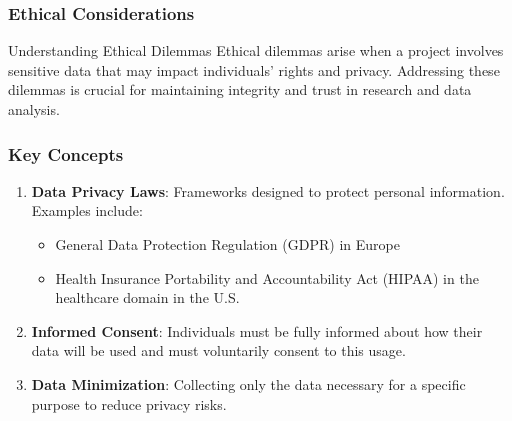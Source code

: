 \documentclass[aspectratio=169]{beamer}
\begin{document}
\begin{frame}[fragile]
  \frametitle{Ethical Considerations}
  \begin{block}{Understanding Ethical Dilemmas}
    Ethical dilemmas arise when a project involves sensitive data that may impact individuals' rights and privacy. Addressing these dilemmas is crucial for maintaining integrity and trust in research and data analysis.
  \end{block}
\end{frame}

\begin{frame}[fragile]
  \frametitle{Key Concepts}
  \begin{enumerate}
    \item \textbf{Data Privacy Laws}: Frameworks designed to protect personal information. Examples include:
    \begin{itemize}
        \item General Data Protection Regulation (GDPR) in Europe
        \item Health Insurance Portability and Accountability Act (HIPAA) in the healthcare domain in the U.S.
    \end{itemize}
    
    \item \textbf{Informed Consent}: Individuals must be fully informed about how their data will be used and must voluntarily consent to this usage.

    \item \textbf{Data Minimization}: Collecting only the data necessary for a specific purpose to reduce privacy risks.
  \end{enumerate}
\end{frame}
\end{document}
